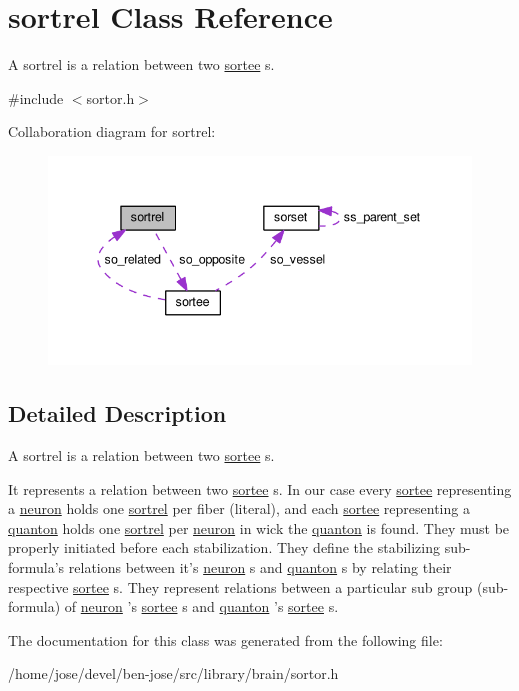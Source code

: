 \hypertarget{classsortrel}{\section{sortrel Class Reference}
\label{classsortrel}
}


A sortrel is a relation between two \hyperlink{classsortee}{sortee} s.  




{\ttfamily \#include $<$sortor.\+h$>$}



Collaboration diagram for sortrel\+:\nopagebreak
\begin{figure}[H]
\begin{center}
\leavevmode
\includegraphics[width=340pt]{d0/d16/classsortrel__coll__graph}
\end{center}
\end{figure}


\subsection{Detailed Description}
A sortrel is a relation between two \hyperlink{classsortee}{sortee} s. 

It represents a relation between two \hyperlink{classsortee}{sortee} s. In our case every \hyperlink{classsortee}{sortee} representing a \hyperlink{classneuron}{neuron} holds one \hyperlink{classsortrel}{sortrel} per fiber (literal), and each \hyperlink{classsortee}{sortee} representing a \hyperlink{classquanton}{quanton} holds one \hyperlink{classsortrel}{sortrel} per \hyperlink{classneuron}{neuron} in wick the \hyperlink{classquanton}{quanton} is found. They must be properly initiated before each stabilization. They define the stabilizing sub-\/formula's relations between it's \hyperlink{classneuron}{neuron} s and \hyperlink{classquanton}{quanton} s by relating their respective \hyperlink{classsortee}{sortee} s. They represent relations between a particular sub group (sub-\/formula) of \hyperlink{classneuron}{neuron} 's \hyperlink{classsortee}{sortee} s and \hyperlink{classquanton}{quanton} 's \hyperlink{classsortee}{sortee} s. 

The documentation for this class was generated from the following file\+:\begin{DoxyCompactItemize}
\item 
/home/jose/devel/ben-\/jose/src/library/brain/sortor.\+h\end{DoxyCompactItemize}
